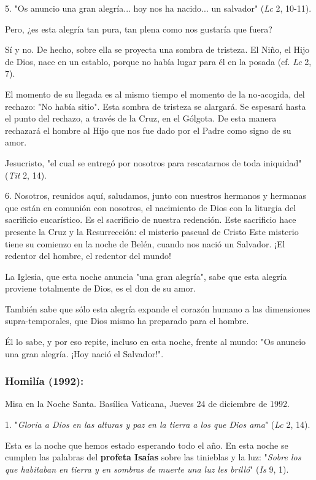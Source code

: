 5. "Os anuncio una gran alegría... hoy nos ha nacido... un salvador"
(\emph{Lc} 2, 10-11).

Pero, ¿es esta alegría tan pura, tan plena como nos gustaría que fuera?

Sí y no. De hecho, sobre ella se proyecta una sombra de tristeza. El
Niño, el Hijo de Dios, nace en un establo, porque no había lugar para él
en la posada (cf. \emph{Lc} 2, 7).

El momento de su llegada es al mismo tiempo el momento de la
no\emph{-}acogida, del rechazo: "No había sitio". Esta sombra de
tristeza se alargará. Se espesará hasta el punto del rechazo, a través
de la Cruz, en el Gólgota. De esta manera rechazará el hombre al Hijo
que nos fue dado por el Padre como signo de su amor.

Jesucristo, "el cual se entregó por nosotros para rescatarnos de toda
iniquidad" (\emph{Tit} 2, 14).

6. Nosotros, reunidos aquí, saludamos, junto con nuestros hermanos y
hermanas que están en comunión con nosotros, el nacimiento de Dios con
la liturgia del sacrificio eucarístico. Es el sacrificio de nuestra
redención. Este sacrificio hace presente la Cruz y la Resurrección: el
misterio pascual de Cristo Este misterio tiene su comienzo en la noche
de Belén, cuando nos nació un Salvador. ¡El redentor del hombre, el
redentor del mundo!

La Iglesia, que esta noche anuncia "una gran alegría", sabe que esta
alegría proviene totalmente de Dios, es el don de su amor.

También sabe que sólo esta alegría expande el corazón humano a las
dimensiones supra-temporales, que Dios mismo ha preparado para el
hombre.

Él lo sabe, y por eso repite, incluso en esta noche, frente al mundo:
"Os anuncio una gran alegría. ¡Hoy nació el Salvador!".

\subsubsection{Homilía (1992): }

Misa en la Noche Santa. Basílica Vaticana, Jueves 24 de diciembre de
1992.

1. "\emph{Gloria a Dios en las alturas y paz en la tierra a los que Dios
	ama}" (\emph{Lc} 2, 14).

Esta es la noche que hemos estado esperando todo el año. En esta noche
se cumplen las palabras del \textbf{profeta Isaías} sobre las tinieblas
y la luz: "\emph{Sobre los que habitaban en tierra y en sombras de
	muerte una luz les brilló}" (\emph{Is} 9, 1).

